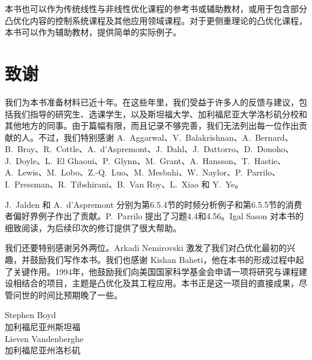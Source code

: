 本书也可以作为传统线性与非线性优化课程的参考书或辅助教材，或用于包含部分凸优化内容的控制系统课程及其他应用领域课程。对于更侧重理论的凸优化课程，本书可以作为辅助教材，提供简单的实际例子。

\section*{致谢}
我们为本书准备材料已近十年。在这些年里，我们受益于许多人的反馈与建议，包括我们指导的研究生、选课学生，以及斯坦福大学、加利福尼亚大学洛杉矶分校和其他地方的同事。由于篇幅有限，而且记录不够完善，我们无法列出每一位作出贡献的人。不过，我们特别感谢 A.~Aggarwal、V.~Balakrishnan、A.~Bernard、B.~Bray、R.~Cottle、A.~d'Aspremont、J.~Dahl、J.~Dattorro、D.~Donoho、J.~Doyle、L.~El Ghaoui、P.~Glynn、M.~Grant、A.~Hansson、T.~Hastie、A.~Lewis、M.~Lobo、Z.-Q.~Luo、M.~Mesbahi、W.~Naylor、P.~Parrilo、I.~Pressman、R.~Tibshirani、B.~Van Roy、L.~Xiao 和 Y.~Ye。

J.~Jalden 和 A.~d'Aspremont 分别为第6.5.4节的时频分析例子和第6.5.5节的消费者偏好界例子作出了贡献。P.~Parrilo 提出了习题4.4和4.56。Igal Sason 对本书的细致阅读，为后续印次的修订提供了很大帮助。

我们还要特别感谢另外两位。Arkadi Nemirovski 激发了我们对凸优化最初的兴趣，并鼓励我们写作本书。我们也感谢 Kishan Baheti，他在本书的形成过程中起了关键作用。1994年，他鼓励我们向美国国家科学基金会申请一项将研究与课程建设相结合的项目，主题是凸优化及其工程应用。本书正是这一项目的直接成果，尽管问世的时间比预期晚了一些。

\begin{flushright}
Stephen Boyd\\
加利福尼亚州斯坦福\\[.8em]
Lieven Vandenberghe\\
加利福尼亚州洛杉矶
\end{flushright}

